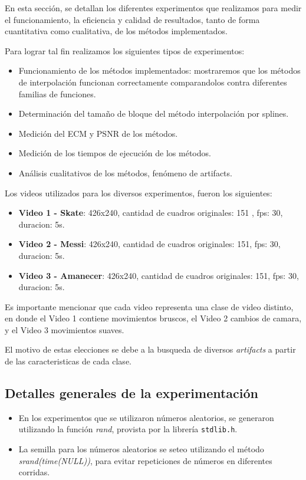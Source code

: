 En esta sección, se detallan los diferentes experimentos que realizamos para medir el funcionamiento, la eficiencia y calidad de resultados, tanto de forma cuantitativa como cualitativa, de los métodos implementados.

Para lograr tal fin realizamos los siguientes tipos de experimentos:
\begin{itemize}
  \item Funcionamiento de los métodos implementados: mostraremos que los métodos de interpolación funcionan correctamente comparandolos contra diferentes familias de funciones.
  \item Determinación del tamaño de bloque del método interpolación por splines.
  \item Medición del ECM y PSNR de los métodos.
  \item Medición de los tiempos de ejecución de los métodos.
  \item Análisis cualitativos de los métodos, fenómeno de artifacts.
\end{itemize}

Los videos utilizados para los diversos experimentos, fueron los siguientes:

\begin{itemize}
  \item \textbf{Video 1 - Skate}: 426x240, cantidad de cuadros originales: 151 , fps: 30, duracion: 5s.
  \item \textbf{Video 2 - Messi}: 426x240, cantidad de cuadros originales: 151, fps: 30, duracion: 5s.
  \item \textbf{Video 3 - Amanecer}: 426x240, cantidad de cuadros originales: 151, fps: 30, duracion: 5s.
\end{itemize}

Es importante mencionar que cada video representa una clase de video distinto, en donde el Video 1 contiene movimientos bruscos, el Video 2 cambios de camara, y el Video 3 movimientos suaves.

El motivo de estas elecciones se debe a la busqueda de diversos \textit{artifacts} a partir de las caracteristicas de cada clase.

\subsection{Detalles generales de la experimentación}

\begin{itemize}
    \item En los experimentos que se utilizaron números aleatorios, se generaron utilizando la función \textit{rand}, provista por la librería \texttt{stdlib.h}.
    \item La semilla para los números aleatorios se seteo utilizando el método \textit{srand(time(NULL))}, para evitar repeticiones de números en diferentes corridas.
\end{itemize}


